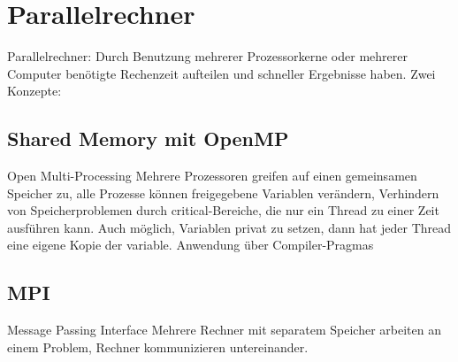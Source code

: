 \documentclass{scrreprt}
\begin{document}
		
	\section{Parallelrechner}
	Parallelrechner: Durch Benutzung mehrerer Prozessorkerne oder mehrerer Computer benötigte Rechenzeit aufteilen und schneller Ergebnisse haben. Zwei Konzepte:
	\subsection{Shared Memory mit OpenMP}
	Open Multi-Processing\cite{specificationsopenmp}
	Mehrere Prozessoren greifen auf einen gemeinsamen Speicher zu, alle Prozesse können freigegebene Variablen verändern, Verhindern von Speicherproblemen durch critical-Bereiche, die nur ein Thread zu einer Zeit ausführen kann. Auch möglich, Variablen privat zu setzen, dann hat jeder Thread eine eigene Kopie der variable. Anwendung über Compiler-Pragmas\cite{tutorialopenmp}
	\subsection{MPI}
	Message Passing Interface
	Mehrere Rechner mit separatem Speicher arbeiten an einem Problem, Rechner kommunizieren untereinander.
	
\end{document}

